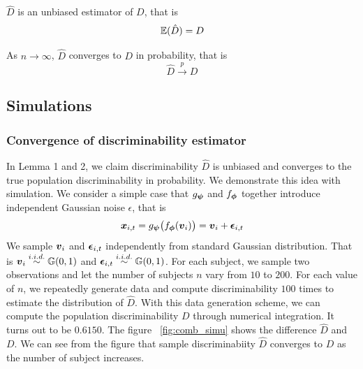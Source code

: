 \documentclass{article}
\begin{document}
\begin{lem}	
	$\hat{D}$ is an unbiased estimator of $D$, that is
	\[ \mathbb{E}(\hat{D}) = D\]
\end{lem}

\begin{lem}	
	As $n \rightarrow \infty$, $\hat{D}$ converges to $D$ in probability, that is
	\[\hat{D} \overset{p}{\rightarrow} D \]
\end{lem}



\subsection{Simulations}
\subsubsection{Convergence of discriminability estimator}
In Lemma 1 and 2, we claim discriminability $\hat{D}$ is unbiased and converges to  the true population discriminability in probability. We demonstrate this idea with simulation. We consider a simple case that $g_{\boldsymbol{\psi}}$ and $f_{\boldsymbol{\phi}}$ together introduce independent Gaussian noise $\epsilon$, that is
\begin{equation}
\boldsymbol{x}_{i,t} =g_{\boldsymbol{\psi}} \big(f_{\boldsymbol{\phi}} (\boldsymbol{v}_i) \big) =\boldsymbol{v}_{i} + \boldsymbol{\epsilon}_{i,t}
\end{equation}  
We sample $\boldsymbol{v}_{i}$ and $\boldsymbol{\epsilon}_{i,t}$ independently from standard Gaussian distribution. That is $\boldsymbol{v}_i \overset{i.i.d.}{\sim} \mathbb{G}(0,1)$ and $\boldsymbol{\epsilon}_{i,t} \overset{i.i.d.}{\sim} \mathbb{G}(0,1)$. For each  subject, we sample two observations and let the number of subjects $n$ vary from $10$ to $200$. For each value of $n$, we repeatedly generate data and compute discriminability $100$ times to estimate the distribution of $\hat{D}$. With this data generation scheme, we can compute the population discriminability $D$ through numerical integration. It turns out to be $0.6150$. The figure ~\ref{fig:comb_simu} shows the difference $\hat{D}$ and $D$. We can see from the figure that sample discriminabiity $\hat{D}$ converges to $D$ as the number of subject increases.
\end{document}
